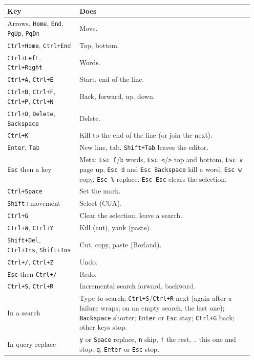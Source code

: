 \documentclass[11pt,a4paper]{article}
\newcommand{\key}[1]{\texttt{#1}}
\begin{document}
\begin{longtable}{@{}p{}p{}@{}}
\toprule
\textbf{Key} & \textbf{Does} \\
\midrule
\endhead
Arrows, \key{Home}, \key{End}, \key{PgUp}, \key{PgDn} & Move. \\
\key{Ctrl+Home}, \key{Ctrl+End} & Top, bottom. \\
\key{Ctrl+Left}, \key{Ctrl+Right} & Words. \\
\key{Ctrl+A}, \key{Ctrl+E} & Start, end of the line. \\
\key{Ctrl+B}, \key{Ctrl+F}, \key{Ctrl+P}, \key{Ctrl+N} & Back, forward, up,
  down. \\
\key{Ctrl+D}, \key{Delete}, \key{Backspace} & Delete. \\
\key{Ctrl+K} & Kill to the end of the line (or join the next). \\
\key{Enter}, \key{Tab} & New line, tab. \key{Shift+Tab} leaves the editor. \\
\key{Esc} then a key & Meta: \key{Esc f}/\key{b} words, \key{Esc <}/\key{>}
  top and bottom, \key{Esc v} page up, \key{Esc d} and \key{Esc Backspace}
  kill a word, \key{Esc w} copy, \key{Esc \%} replace. \key{Esc Esc}
  clears the selection. \\
\key{Ctrl+Space} & Set the mark. \\
\key{Shift}+movement & Select (CUA). \\
\key{Ctrl+G} & Clear the selection; leave a search. \\
\key{Ctrl+W}, \key{Ctrl+Y} & Kill (cut), yank (paste). \\
\key{Shift+Del}, \key{Ctrl+Ins}, \key{Shift+Ins} & Cut, copy, paste
  (Borland). \\
\key{Ctrl+/}, \key{Ctrl+Z} & Undo. \\
\key{Esc} then \key{Ctrl+/} & Redo. \\
\key{Ctrl+S}, \key{Ctrl+R} & Incremental search forward, backward. \\
In a search & Type to search; \key{Ctrl+S}/\key{Ctrl+R} next (again after a
  failure wraps; on an empty search, the last one); \key{Backspace} shorter;
  \key{Enter} or \key{Esc} stay; \key{Ctrl+G} back; other keys stop. \\
In query replace & \key{y} or \key{Space} replace, \key{n} skip, \key{!}
  the rest, \key{.} this one and stop, \key{q}, \key{Enter} or \key{Esc}
  stop. \\
\bottomrule
\end{longtable}
\end{document}
